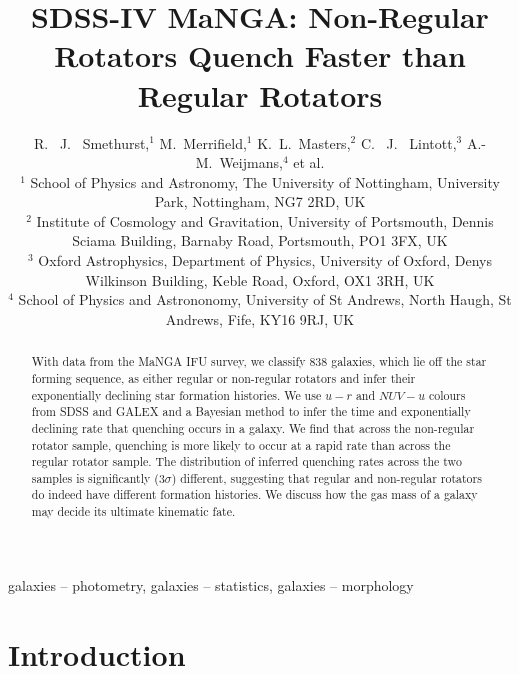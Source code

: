 \documentclass[useAMS,usenatbib]{mn2e}
\begin{document}
\title[Quenching Histories of Regular and Non-Regular Rotators]{SDSS-IV MaNGA: Non-Regular Rotators Quench Faster than Regular Rotators}
\author[Smethurst et al. 2017]{R. ~J. ~Smethurst,$^{1}$ M.~Merrifield,$^{1}$ K.~L.~Masters,$^{2}$  C. ~J. ~Lintott,$^{3}$ \newauthor A.-M.~Weijmans,$^{4}$ et al.
\\ $^1$ School of Physics and Astronomy, The University of Nottingham, University Park, Nottingham, NG7 2RD, UK
\\ $^2$ Institute of Cosmology and Gravitation, University of Portsmouth, Dennis Sciama Building, Barnaby Road, Portsmouth, PO1 3FX, UK 
\\ $^3$ Oxford Astrophysics, Department of Physics, University of Oxford, Denys Wilkinson Building, Keble Road, Oxford, OX1 3RH, UK
\\ $^4$ School of Physics and Astrononomy, University of St Andrews, North Haugh, St Andrews, Fife, KY16 9RJ, UK
}

\maketitle

\begin{abstract}
With data from the MaNGA IFU survey, we classify $838$ galaxies, which lie off the star forming sequence, as either regular or non-regular rotators and infer their exponentially declining star formation histories. We use $u-r$ and $NUV-u$ colours from SDSS and GALEX and a Bayesian method to infer the time and exponentially declining rate that quenching occurs in a galaxy. We find that across the non-regular rotator sample, quenching is more likely to occur at a rapid rate than across the regular rotator sample. The distribution of inferred quenching rates across the two samples is significantly ($3\sigma$) different, suggesting that regular and non-regular rotators do indeed have different formation histories. We discuss how the gas mass of a galaxy may decide its ultimate kinematic fate. 
\end{abstract}

\begin{keywords}
galaxies -- photometry, galaxies -- statistics, galaxies -- morphology
\end{keywords}

\section{Introduction}\label{sec:intro}
\end{document}
